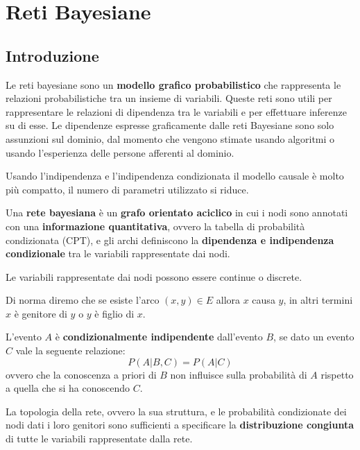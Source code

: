 \chapter{Reti Bayesiane} \label{cap:RetiBayesiane}
\section{Introduzione}
Le reti bayesiane sono un \textbf{modello grafico probabilistico} che rappresenta
le relazioni probabilistiche tra un insieme di variabili. Queste reti sono utili
per rappresentare le relazioni di dipendenza tra le variabili e per effettuare
inferenze su di esse. Le dipendenze espresse graficamente dalle reti Bayesiane
sono solo assunzioni sul dominio, dal momento che vengono stimate usando algoritmi
o usando l'esperienza delle persone afferenti al dominio.

Usando l'indipendenza e l'indipendenza condizionata il modello causale è molto
più compatto, il numero di parametri utilizzato si riduce.
\begin{definizione}
    Una \textbf{rete bayesiana} è un \textbf{grafo orientato aciclico} in cui i
    nodi sono annotati con una \textbf{informazione quantitativa}, ovvero la
    tabella di probabilità condizionata (CPT), e gli archi definiscono la
    \textbf{dipendenza e indipendenza condizionale} tra le variabili rappresentate
    dai nodi.
\end{definizione}
\begin{nota}
    Le variabili rappresentate dai nodi possono essere continue o discrete.
\end{nota}
Di norma diremo che se esiste l'arco $(x,y)\in E$ allora $x$ causa $y$, in altri
termini $x$ è genitore di $y$ o $y$ è figlio di $x$.
\begin{center}
\end{center}
\begin{definizione}
    L'evento $A$ è \textbf{condizionalmente indipendente} dall'evento $B$, se dato
    un evento $C$ vale la seguente relazione:
    \begin{equation}
        P(A|B,C) = P(A|C)
    \end{equation}
    ovvero che la conoscenza a priori di $B$ non influisce sulla probabilità di
    $A$ rispetto a quella che si ha conoscendo $C$.
\end{definizione}
La topologia della rete, ovvero la sua struttura, e le probabilità condizionate
dei nodi dati i loro genitori sono sufficienti a specificare la \textbf{distribuzione
    congiunta} di tutte le variabili rappresentate dalla rete.

